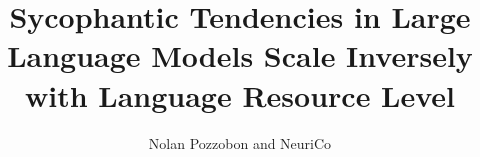 \documentclass{article}
\title{Sycophantic Tendencies in Large Language Models Scale Inversely with Language Resource Level}
\author{Nolan Pozzobon and NeuriCo}
\begin{document}
\maketitle

\begin{abstract}

\end{abstract}










\end{document}
